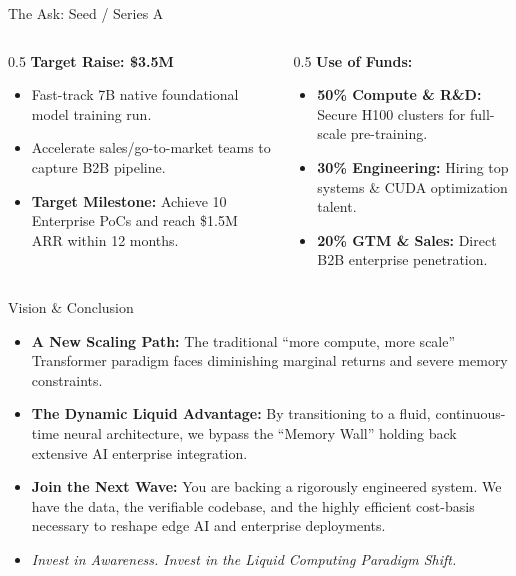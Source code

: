 ﻿\documentclass[aspectratio=169, 10pt]{beamer}
\begin{document}
\begin{frame}{The Ask: Seed / Series A}
\begin{columns}
\begin{column}{0.5\textwidth}
\textbf{Target Raise: \$3.5M}
\vspace{0.5em}
\begin{itemize}
    \item Fast-track 7B native foundational model training run.
    \item Accelerate sales/go-to-market teams to capture B2B pipeline.
    \item \textbf{Target Milestone:} Achieve 10 Enterprise PoCs and reach \$1.5M ARR within 12 months.
\end{itemize}
\end{column}
\begin{column}{0.5\textwidth}
\textbf{Use of Funds:}
\begin{itemize}
    \item \textbf{50\% Compute \& R\&D:} Secure H100 clusters for full-scale pre-training.
    \item \textbf{30\% Engineering:} Hiring top systems \& CUDA optimization talent.
    \item \textbf{20\% GTM \& Sales:} Direct B2B enterprise penetration.
\end{itemize}
\end{column}
\end{columns}
\end{frame}

\begin{frame}{Vision \& Conclusion}
\begin{itemize}
    \item \textbf{A New Scaling Path:} The traditional ``more compute, more scale'' Transformer paradigm faces diminishing marginal returns and severe memory constraints.
    \item \textbf{The Dynamic Liquid Advantage:} By transitioning to a fluid, continuous-time neural architecture, we bypass the ``Memory Wall'' holding back extensive AI enterprise integration.
    \item \textbf{Join the Next Wave:} You are backing a rigorously engineered system. We have the data, the verifiable codebase, and the highly efficient cost-basis necessary to reshape edge AI and enterprise deployments.
    \vspace{0.5em}
    \item \textit{Invest in Awareness. Invest in the Liquid Computing Paradigm Shift.}
\end{itemize}
\end{frame}
\end{document}
